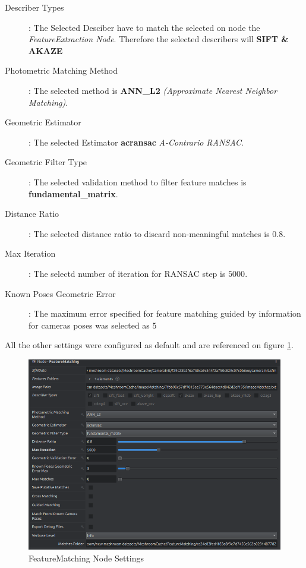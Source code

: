 \documentclass[12pt]{report}
\begin{document}
\begin{description}
  \item[Describer Types]: The Selected Desciber have to  match the selected on node the \textit{FeatureExtraction Node}. Therefore the selected describers will \textbf{SIFT \& AKAZE}
  \item[Photometric Matching Method]: The selected method is \textbf{ANN\_L2} \textit{(Approximate Nearest Neighbor Matching)}.
  \item[Geometric Estimator]: The selected Estimator \textbf{acransac}  \textit{A-Contrario RANSAC}.
  \item[Geometric Filter Type]: The selected validation method to filter feature matches is \textbf{fundamental\_matrix}.
  \item[Distance Ratio]: The selected distance ratio to discard non-meaningful matches  is $0.8$.
  \item[Max Iteration]: The selectd number of iteration for RANSAC step is $5000$.
  \item[Known Poses Geometric Error] : The maximum error specified for feature matching guided by information for cameras poses was selected as $5$
\end{description}
All the other settings were configured as default and are referenced on figure \ref{fig:fEATUREmATCHING}.

\begin{figure}[H]%
  \centering
 \includegraphics[width=1\textwidth]{featurematchingNOde.png}
\caption{FeatureMatching Node Settings}
\label{fig:fEATUREmATCHING} 
\end{figure}
\end{document}
